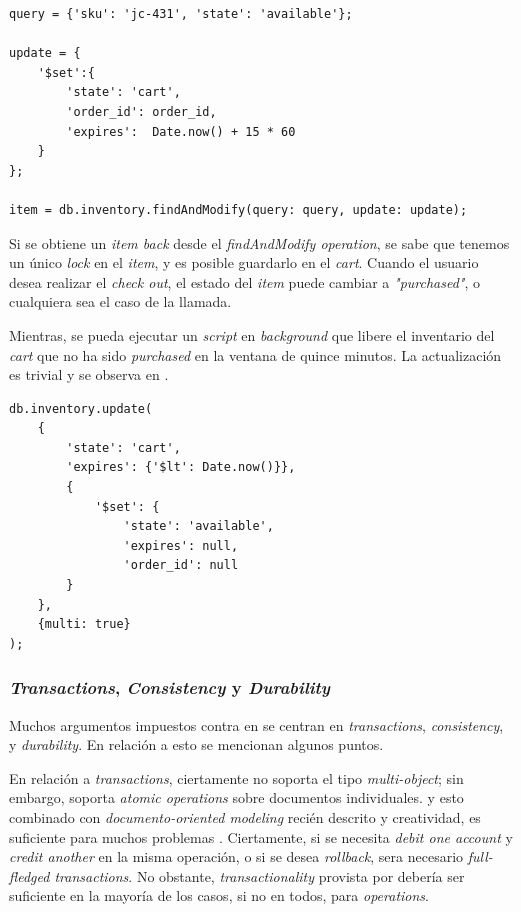 \begin{lstlisting}[caption= Marcando un \textit{item} con tiempo de espiración., label=source:javascript:example_add_inventory_expiartion_mongodb]
query = {'sku': 'jc-431', 'state': 'available'};

update = {
	'$set':{
		'state': 'cart',
		'order_id': order_id,
		'expires':  Date.now() + 15 * 60
	}
};

item = db.inventory.findAndModify(query: query, update: update);
\end{lstlisting}

Si se obtiene un \textit{item back} desde el \textit{findAndModify operation}, se sabe que tenemos un único \textit{lock} en el \textit{item}, y es posible guardarlo en el \textit{cart}. Cuando el usuario desea realizar el \textit{check out}, el estado del \textit{item} puede cambiar a \textit{"purchased"}, o cualquiera sea el caso de la llamada.

Mientras, se pueda ejecutar un \textit{script} en \textit{background} que libere el inventario del \textit{cart} que no ha sido \textit{purchased} en la ventana de quince minutos. La actualización es trivial y se observa en .


\begin{lstlisting}[caption= Ejemplo de \textit{script} corriendo \textit{background}., label=source:javascript:example_add_script_background_mongodb]
db.inventory.update(
	{
		'state': 'cart',
		'expires': {'$lt': Date.now()}},
		{
			'$set': {
				'state': 'available',
				'expires': null,
				'order_id': null
		}
	},
	{multi: true}
);
\end{lstlisting} 

\subsubsection{\textit{Transactions}, \textit{Consistency} y \textit{Durability}}

Muchos argumentos impuestos contra  en \ecommerce se centran en \textit{transactions}, \textit{consistency}, y \textit{durability}. En relación a esto se mencionan algunos puntos.

En relación a \textit{transactions}, ciertamente  no soporta el tipo \textit{multi-object}; sin embargo, soporta \textit{atomic operations} sobre documentos individuales. y esto combinado con \textit{documento-oriented modeling} recién descrito y creatividad, es suficiente para muchos problemas \ecommerce. Ciertamente, si se necesita \textit{debit one account} y \textit{credit another} en la misma operación, o si se desea \textit{rollback}, sera necesario \textit{full-fledged transactions}. No obstante, \textit{transactionality} provista por  debería ser suficiente en la mayoría de los casos, si no en todos, para \ecommerce \textit{operations}.

